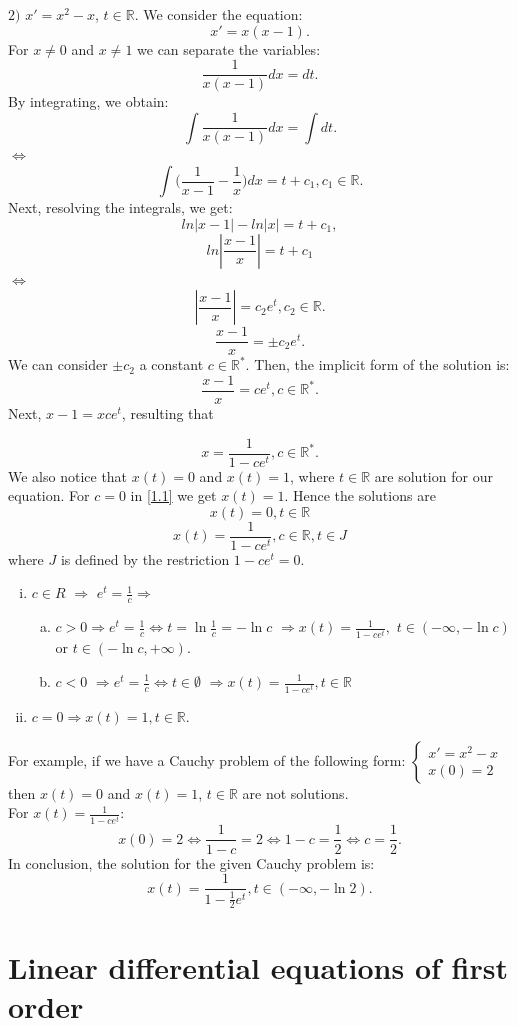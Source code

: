 \documentclass[a4paper,12pt]{report}
\newcommand{\R}{\mathbb{R}}
\begin{document}
$2)$ $x'=x^{2}-x$, $t\in \R.$ We consider the equation: $$x'=x(x-1).$$ For $x\neq0$ and $x\neq1$ we can separate the variables: $$\frac{1}{x(x-1)}dx=dt.$$ By integrating, we obtain: $$\int \frac{1}{x(x-1)} dx = \int dt.$$ $\Leftrightarrow$ $$\int \bigg(\frac{1}{x-1}-\frac{1}{x}\bigg)dx=t+c_{1}, c_{1} \in \R.$$ Next, resolving the integrals, we get:
$$ln|x-1|-ln|x|=t+c_{1},$$ $$ln|\frac{x-1}{x}|=t+c_{1}$$ $\Leftrightarrow$ $$|\frac{x-1}{x}|=c_{2}e^{t}, c_{2} \in \R.$$ $$\frac{x-1}{x}=\pm c_{2} e^{t}.$$ We can consider $\pm c_{2}$ a constant $c \in \R^{*}$. Then, the implicit form of the solution is: $$\frac{x-1}{x}=ce^{t}, c\in \R^{*}.$$ Next, $x-1=xce^{t}$, resulting that 

\begin{equation}
x=\frac{1}{1-ce^{t}}, c\in \R^{*}.
\end{equation}
We also notice that $x(t)=0$ and $x(t)=1$, where $t\in \R$ are solution for our equation. For $c=0$ in \eqref{1.1} we get $x(t)=1$. Hence the solutions are $$x(t)=0, t\in\R$$ $$x(t)=\frac{1}{1-ce^{t}}, c\in \R, t\in J$$ where $J$ is defined by the restriction $1-ce^{t}=0$.
\begin{enumerate}[(i)]
 \item $c \in R$ $\Rightarrow$ $e^{t}=\frac{1}{c}\Rightarrow$
 \begin{enumerate}[(a)]
  \item $c>0\Rightarrow e^{t}=\frac{1}{c} \Leftrightarrow t=\ln{\frac{1}{c}}=-\ln {c}$ $\Rightarrow x(t)=\frac{1}{1-ce^{t}},$ $t\in (-\infty,-\ln{c})$ or $t\in (-\ln{c},+\infty)$.
  \item $c<0$ $\Rightarrow e^{t}=\frac{1}{c} \Leftrightarrow t\in \emptyset$ $\Rightarrow x(t)=\frac{1}{1-ce^{t}}, t\in \R$
 \end{enumerate}
 \item $c=0 \Rightarrow x(t)=1, t\in \R.$
\end{enumerate}
For example, if we have a Cauchy problem of the following form:
$\begin{cases}
  x'=x^{2}-x\\
  x(0)=2
 \end{cases}
$
then $x(t)=0$ and $x(t)=1$, $t\in \R$ are not solutions.\\
For $x(t)=\frac{1}{1-ce^{t}}$: $$x(0)=2 \Leftrightarrow \frac{1}{1-c}=2 \Leftrightarrow 1-c=\frac{1}{2} \Leftrightarrow c=\frac{1}{2}.$$ In conclusion, the solution for the given Cauchy problem is:$$x(t)=\frac{1}{1-\frac{1}{2}e^{t}}, t\in (-\infty,-\ln{2}).$$


\section{Linear differential equations of first order}
\end{document}
